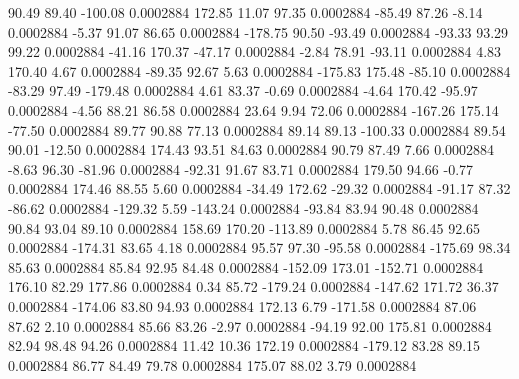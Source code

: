        90.49       89.40     -100.08     0.0002884
      172.85       11.07       97.35     0.0002884
      -85.49       87.26       -8.14     0.0002884
       -5.37       91.07       86.65     0.0002884
     -178.75       90.50      -93.49     0.0002884
      -93.33       93.29       99.22     0.0002884
      -41.16      170.37      -47.17     0.0002884
       -2.84       78.91      -93.11     0.0002884
        4.83      170.40        4.67     0.0002884
      -89.35       92.67        5.63     0.0002884
     -175.83      175.48      -85.10     0.0002884
      -83.29       97.49     -179.48     0.0002884
        4.61       83.37       -0.69     0.0002884
       -4.64      170.42      -95.97     0.0002884
       -4.56       88.21       86.58     0.0002884
       23.64        9.94       72.06     0.0002884
     -167.26      175.14      -77.50     0.0002884
       89.77       90.88       77.13     0.0002884
       89.14       89.13     -100.33     0.0002884
       89.54       90.01      -12.50     0.0002884
      174.43       93.51       84.63     0.0002884
       90.79       87.49        7.66     0.0002884
       -8.63       96.30      -81.96     0.0002884
      -92.31       91.67       83.71     0.0002884
      179.50       94.66       -0.77     0.0002884
      174.46       88.55        5.60     0.0002884
      -34.49      172.62      -29.32     0.0002884
      -91.17       87.32      -86.62     0.0002884
     -129.32        5.59     -143.24     0.0002884
      -93.84       83.94       90.48     0.0002884
       90.84       93.04       89.10     0.0002884
      158.69      170.20     -113.89     0.0002884
        5.78       86.45       92.65     0.0002884
     -174.31       83.65        4.18     0.0002884
       95.57       97.30      -95.58     0.0002884
     -175.69       98.34       85.63     0.0002884
       85.84       92.95       84.48     0.0002884
     -152.09      173.01     -152.71     0.0002884
      176.10       82.29      177.86     0.0002884
        0.34       85.72     -179.24     0.0002884
     -147.62      171.72       36.37     0.0002884
     -174.06       83.80       94.93     0.0002884
      172.13        6.79     -171.58     0.0002884
       87.06       87.62        2.10     0.0002884
       85.66       83.26       -2.97     0.0002884
      -94.19       92.00      175.81     0.0002884
       82.94       98.48       94.26     0.0002884
       11.42       10.36      172.19     0.0002884
     -179.12       83.28       89.15     0.0002884
       86.77       84.49       79.78     0.0002884
      175.07       88.02        3.79     0.0002884
